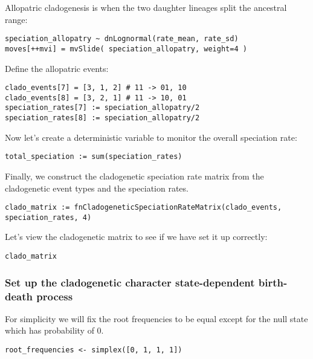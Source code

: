 Allopatric cladogenesis is when the two daughter lineages
split the ancestral range:
{\tt \begin{snugshade*}
\begin{lstlisting}
speciation_allopatry ~ dnLognormal(rate_mean, rate_sd)
moves[++mvi] = mvSlide( speciation_allopatry, weight=4 )
\end{lstlisting}
\end{snugshade*}}

Define the allopatric events:
{\tt \begin{snugshade*}
\begin{lstlisting}
clado_events[7] = [3, 1, 2] # 11 -> 01, 10
clado_events[8] = [3, 2, 1] # 11 -> 10, 01
speciation_rates[7] := speciation_allopatry/2
speciation_rates[8] := speciation_allopatry/2
\end{lstlisting}
\end{snugshade*}}

Now let's create a deterministic variable to monitor the overall speciation rate:
{\tt \begin{snugshade*}
\begin{lstlisting}
total_speciation := sum(speciation_rates)
\end{lstlisting}
\end{snugshade*}}

Finally, we construct the cladogenetic speciation rate
matrix from the cladogenetic event types and the speciation rates.
{\tt \begin{snugshade*}
\begin{lstlisting}
clado_matrix := fnCladogeneticSpeciationRateMatrix(clado_events, speciation_rates, 4)
\end{lstlisting}
\end{snugshade*}}

Let's view the cladogenetic matrix to see if we have set it up correctly:
{\tt \begin{snugshade*}
\begin{lstlisting}
clado_matrix
\end{lstlisting}
\end{snugshade*}}

\subsubsection{Set up the cladogenetic character state-dependent birth-death process}

For simplicity we will fix the root frequencies to be equal except for the null state
which has probability of 0.
{\tt \begin{snugshade*}
\begin{lstlisting}
root_frequencies <- simplex([0, 1, 1, 1])
\end{lstlisting}
\end{snugshade*}}

